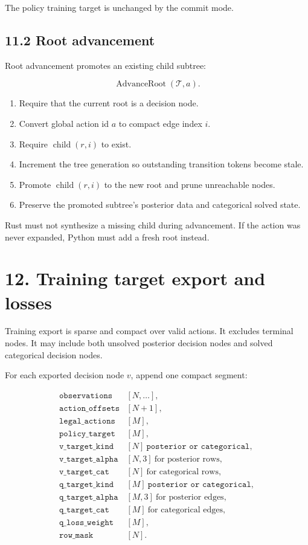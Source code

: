 \documentclass[11pt]{article}
\newcommand{\Tree}{\mathcal{T}}
\newcommand{\Child}{\operatorname{child}}
\newcommand{\AdvanceRoot}{\operatorname{AdvanceRoot}}
\begin{document}
The policy training target is unchanged by the commit mode.

\subsection*{11.2 Root advancement}

Root advancement promotes an existing child subtree:

\[
\AdvanceRoot(\Tree,a).
\]

\begin{enumerate}[leftmargin=2em]
  \item Require that the current root is a decision node.
  \item Convert global action id \(a\) to compact edge index \(i\).
  \item Require \(\Child(r,i)\) to exist.
  \item Increment the tree generation so outstanding transition tokens become
  stale.
  \item Promote \(\Child(r,i)\) to the new root and prune unreachable nodes.
  \item Preserve the promoted subtree's posterior data and categorical solved
  state.
\end{enumerate}

Rust must not synthesize a missing child during advancement. If the action was
never expanded, Python must add a fresh root instead.

\section*{12. Training target export and losses}

Training export is sparse and compact over valid actions. It excludes terminal
nodes. It may include both unsolved posterior decision nodes and solved
categorical decision nodes.

For each exported decision node \(v\), append one compact segment:

\[
\begin{array}{ll}
\texttt{observations}        & [N,\ldots],\\
\texttt{action\_offsets}     & [N+1],\\
\texttt{legal\_actions}      & [M],\\
\texttt{policy\_target}      & [M],\\
\texttt{v\_target\_kind}     & [N]\ \texttt{posterior or categorical},\\
\texttt{v\_target\_alpha}    & [N,3]\ \text{for posterior rows},\\
\texttt{v\_target\_cat}      & [N]\ \text{for categorical rows},\\
\texttt{q\_target\_kind}     & [M]\ \texttt{posterior or categorical},\\
\texttt{q\_target\_alpha}    & [M,3]\ \text{for posterior edges},\\
\texttt{q\_target\_cat}      & [M]\ \text{for categorical edges},\\
\texttt{q\_loss\_weight}     & [M],\\
\texttt{row\_mask}           & [N].
\end{array}
\]
\end{document}
